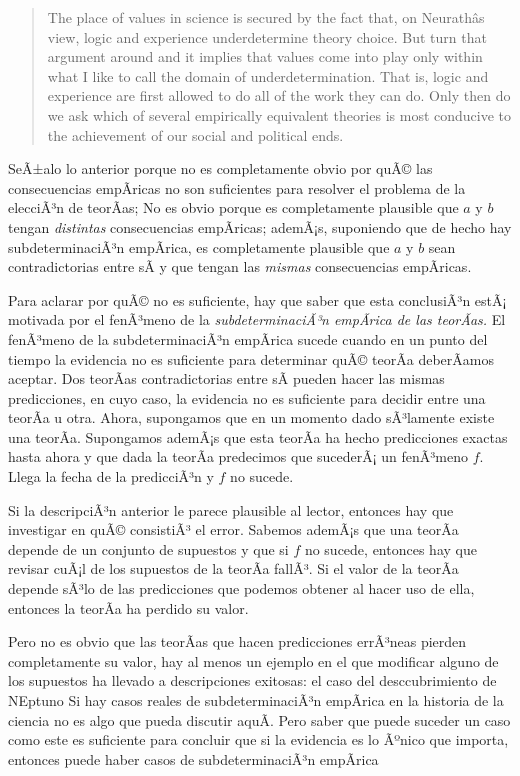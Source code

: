 \begin{quote}
	The place of values in science is secured by the fact that, on Neurathâs view, logic and experience underdetermine theory choice.
	But turn that argument around and it implies that values come into play only within what I like to call the domain of underdetermination. 
	That is, logic and experience are first allowed to do all of the work they can do. 
	Only then do we ask which of several empirically equivalent theories is most conducive to the achievement of our social and political ends. \parencite[p.~10]{Howard2006}
\end{quote}

SeÃ±alo lo anterior porque no es completamente obvio por quÃ© las consecuencias empÃ­ricas no son suficientes para resolver el problema de la elecciÃ³n de teorÃ­as;
No es obvio porque es completamente plausible que $a$ y $b$ tengan \emph{distintas} consecuencias empÃ­ricas;
ademÃ¡s, suponiendo que de hecho hay subdeterminaciÃ³n empÃ­rica, es completamente plausible que $a$ y $b$ sean contradictorias entre sÃ­ y que tengan las \emph{mismas} consecuencias empÃ­ricas.

Para aclarar por quÃ© no es suficiente, hay que saber que esta conclusiÃ³n estÃ¡ motivada por el fenÃ³meno de la \emph{subdeterminaciÃ³n empÃ­rica de las teorÃ­as.}
El fenÃ³meno de la subdeterminaciÃ³n empÃ­rica sucede cuando en un punto del tiempo la evidencia no es suficiente para determinar quÃ© teorÃ­a deberÃ­amos aceptar.
Dos teorÃ­as contradictorias entre sÃ­ pueden hacer las mismas predicciones, en cuyo caso, la evidencia no es suficiente para decidir entre una teorÃ­a u otra.
Ahora, supongamos que en un momento dado sÃ³lamente existe una teorÃ­a.
Supongamos ademÃ¡s que esta teorÃ­a ha hecho predicciones exactas hasta ahora y que dada la teorÃ­a predecimos que sucederÃ¡ un fenÃ³meno $f$.
Llega la fecha de la predicciÃ³n y $f$ no sucede.

Si la descripciÃ³n anterior le parece plausible al lector, entonces hay que investigar en quÃ© consistiÃ³ el error.
Sabemos ademÃ¡s que una teorÃ­a depende de un conjunto de supuestos y que si $f$ no sucede, entonces hay que revisar cuÃ¡l de los supuestos de la teorÃ­a fallÃ³.
Si el valor de la teorÃ­a depende sÃ³lo de las predicciones que podemos obtener al hacer uso de ella, entonces la teorÃ­a ha perdido su valor.

Pero no es obvio que las teorÃ­as que hacen predicciones errÃ³neas pierden completamente su valor, hay al menos un ejemplo en el que modificar alguno de los supuestos ha llevado a descripciones exitosas: el caso del desccubrimiento de NEptuno  
Si hay casos reales de subdeterminaciÃ³n empÃ­rica en la historia de la ciencia no es algo que pueda discutir aquÃ­.
Pero saber que puede suceder un caso como este es suficiente para concluir que si la evidencia es lo Ãºnico que importa, entonces puede haber casos de subdeterminaciÃ³n empÃ­rica 



